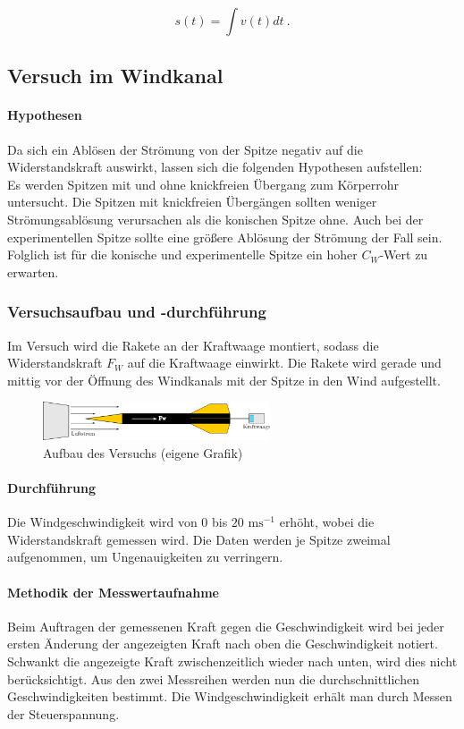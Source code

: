 \documentclass[10pt,a4paper]{article}
\begin{document}
$$ s(t) = \int v(t)dt \ . $$


\subsection{Versuch im Windkanal}

\paragraph{Hypothesen}
Da sich ein Ablösen der Strömung von der Spitze negativ auf die Widerstandskraft auswirkt, lassen sich die folgenden Hypothesen aufstellen: \\
Es werden Spitzen mit und ohne knickfreien Übergang zum Körperrohr untersucht. Die Spitzen mit knickfreien Übergängen  sollten weniger Strömungsablösung verursachen als die konischen Spitze ohne. Auch bei der experimentellen Spitze sollte eine größere Ablösung der Strömung der Fall sein. Folglich ist für die konische und experimentelle Spitze ein hoher $C_{W}$-Wert zu erwarten.


\subsubsection{Versuchsaufbau und -durchführung}

Im Versuch wird die Rakete an der Kraftwaage montiert, sodass die Widerstandskraft $F_{W}$ auf die Kraftwaage einwirkt. Die Rakete wird gerade und mittig vor der Öffnung des Windkanals mit der Spitze in den Wind aufgestellt. 

\begin{figure}[H]
	\centering
	\includegraphics[width=0.6\textwidth]{Bilder/Versuchsaufbau.png}
	\caption{Aufbau des Versuchs (eigene Grafik)}
\end{figure}

\paragraph{Durchführung}
Die Windgeschwindigkeit wird von 0 bis $20 \text{ ms}^{-1}$ erhöht, wobei die Widerstandskraft gemessen wird. Die Daten werden je Spitze zweimal aufgenommen, um Ungenauigkeiten zu verringern.

\paragraph{Methodik der Messwertaufnahme}
Beim Auftragen der gemessenen Kraft gegen die Geschwindigkeit wird bei jeder ersten Änderung der  angezeigten Kraft nach oben die Geschwindigkeit notiert. Schwankt die angezeigte Kraft zwischenzeitlich wieder nach unten, wird dies nicht berücksichtigt. Aus den zwei Messreihen werden nun die durchschnittlichen Geschwindigkeiten bestimmt. Die Windgeschwindigkeit erhält man durch Messen der Steuerspannung.
\end{document}
